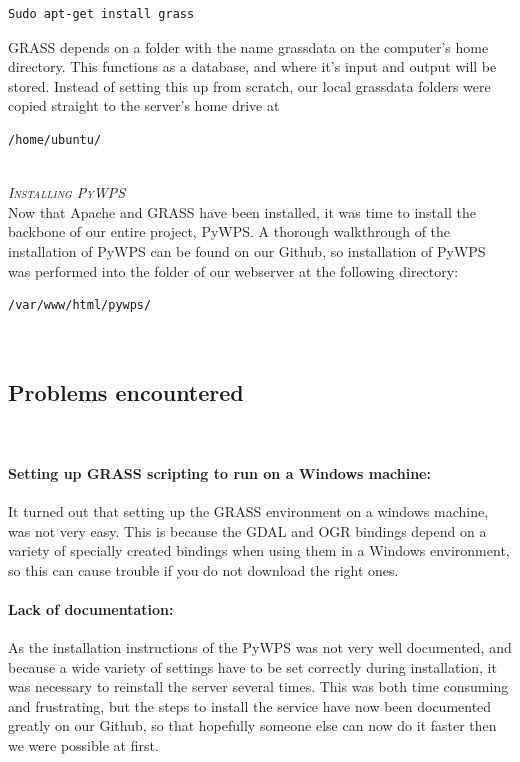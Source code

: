 \begin{lstlisting}
Sudo apt-get install grass
\end{lstlisting}

GRASS depends on a folder with the name grassdata on the computer's home directory. This functions as a database, and where it's input and output will be stored. Instead of setting this up from scratch, our local grassdata folders were copied straight to the server's home drive at

\begin{lstlisting} 
/home/ubuntu/
\end{lstlisting}\\

\textsc{\textit{Installing PyWPS}}\\

Now that Apache and GRASS have been installed, it was time to install the backbone of our entire project, PyWPS.
A thorough walkthrough of the installation of PyWPS can be found on our Github, so installation of PyWPS was performed into the folder of our webserver at the following directory:

\begin{lstlisting}
/var/www/html/pywps/
\end{lstlisting}\\

\subsection{Problems encountered}\\

\paragraph{Setting up GRASS scripting to run on a Windows machine:} It turned out that setting up the GRASS environment on a windows machine, was not very easy. This is because the GDAL and OGR bindings depend on a variety of specially created bindings when using them in a Windows environment, so this can cause trouble if you do not download the right ones.\\

\paragraph{Lack of documentation:} As the installation instructions of the PyWPS was not very well documented, and because a wide variety of settings have to be set correctly during installation, it was necessary to reinstall the server several times. This was both time consuming and frustrating, but the steps to install the service have now been documented greatly on our Github, so that hopefully someone else can now do it faster then we were possible at first. 

